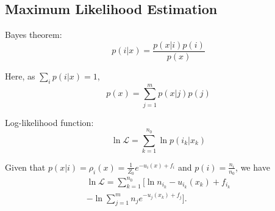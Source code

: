 \documentclass[aip,jcp,reprint,amsmath,amssymb]{revtex4-1}
\begin{document}
\subsection{Maximum Likelihood Estimation}

Bayes theorem:
\begin{equation}
p(i|x) = \frac{p(x|i) p(i)}{p(x)}
\end{equation}

Here, as $\sum_i p(i|x) = 1$,
\begin{equation*}
p(x) = \sum_{j=1}^m p(x|j) p(j)
\end{equation*}

Log-likelihood function:
\begin{equation}
\ln \mathcal{L} = \sum_{k=1}^{n_0} \ln p(i_k|x_k)
\end{equation}

Given that $p(x|i) = \rho_i(x) = \frac{1}{Z_0}e^{-u_i(x)+f_i}$ and $p(i) = \frac{n_i}{n_0}$, we have
\begin{align}
\ln \mathcal{L} = \sum_{k=1}^{n_0} \Bigg[\ln n_{i_k} - u_{i_k}(x_k) + f_{i_k} \\ - \ln \sum_{j=1}^m n_j e^{-u_j(x_k) + f_j}\Bigg].
\end{align}


\end{document}
